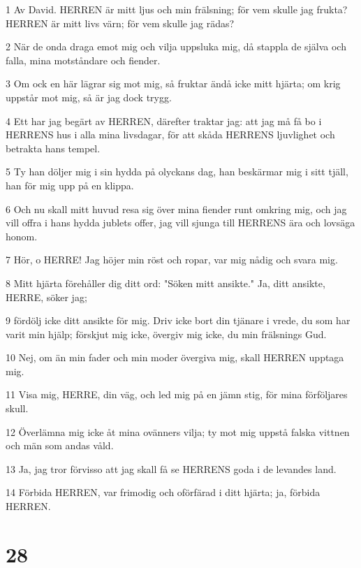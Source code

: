 \par 1 Av David. HERREN är mitt ljus och min frälsning; för vem skulle jag frukta? HERREN är mitt livs värn; för vem skulle jag rädas?
\par 2 När de onda draga emot mig och vilja uppsluka mig, då stappla de själva och falla, mina motståndare och fiender.
\par 3 Om ock en här lägrar sig mot mig, så fruktar ändå icke mitt hjärta; om krig uppstår mot mig, så är jag dock trygg.
\par 4 Ett har jag begärt av HERREN, därefter traktar jag: att jag må få bo i HERRENS hus i alla mina livsdagar, för att skåda HERRENS ljuvlighet och betrakta hans tempel.
\par 5 Ty han döljer mig i sin hydda på olyckans dag, han beskärmar mig i sitt tjäll, han för mig upp på en klippa.
\par 6 Och nu skall mitt huvud resa sig över mina fiender runt omkring mig, och jag vill offra i hans hydda jublets offer, jag vill sjunga till HERRENS ära och lovsäga honom.
\par 7 Hör, o HERRE! Jag höjer min röst och ropar, var mig nådig och svara mig.
\par 8 Mitt hjärta förehåller dig ditt ord: "Söken mitt ansikte." Ja, ditt ansikte, HERRE, söker jag;
\par 9 fördölj icke ditt ansikte för mig. Driv icke bort din tjänare i vrede, du som har varit min hjälp; förskjut mig icke, övergiv mig icke, du min frälsnings Gud.
\par 10 Nej, om än min fader och min moder övergiva mig, skall HERREN upptaga mig.
\par 11 Visa mig, HERRE, din väg, och led mig på en jämn stig, för mina förföljares skull.
\par 12 Överlämna mig icke åt mina ovänners vilja; ty mot mig uppstå falska vittnen och män som andas våld.
\par 13 Ja, jag tror förvisso att jag skall få se HERRENS goda i de levandes land.
\par 14 Förbida HERREN, var frimodig och oförfärad i ditt hjärta; ja, förbida HERREN.

\chapter{28}

